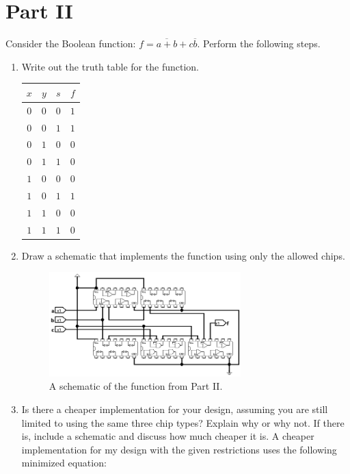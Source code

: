 \documentclass{article}
\begin{document}
\newpage
\section*{Part II}

Consider the Boolean function: $f = \overline{a + b} + c\overline{b}$.
Perform the following steps.

\begin{enumerate}

\item Write out the truth table for the function.
\begin{center}
\begin{tabular}{ccc|c}
$x$&$y$&$s$&$f$\\
\hline
$0$&$0$&$0$&$1$\\
$0$&$0$&$1$&$1$\\
$0$&$1$&$0$&$0$\\
$0$&$1$&$1$&$0$\\
$1$&$0$&$0$&$0$\\
$1$&$0$&$1$&$1$\\
$1$&$1$&$0$&$0$\\
$1$&$1$&$1$&$0$\\
\end{tabular}
\end{center}
\item Draw a schematic that implements the function using only the allowed chips.

\begin{figure}[!ht]
    \centering
    \includegraphics[width=0.7\textwidth]{lab1_part2.png}
    \caption{A schematic of the function from Part II.}
    \label{f:lab1_part2}
\end{figure}

\item Is there a cheaper implementation for your design, assuming you are still limited to using the same three chip types?
    Explain why or why not.
    If there is, include a schematic and discuss how much cheaper it is.
    A cheaper implementation for my design with the given restrictions uses the following minimized equation:
    

\end{enumerate}
\end{document}
